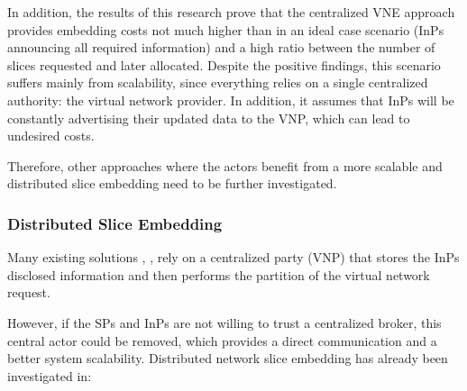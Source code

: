 In addition, the results of this research prove that the centralized VNE approach provides embedding costs not much higher than in an ideal case scenario (InPs announcing all required information) and a high ratio between the number of slices requested and later allocated. Despite the positive findings, this scenario suffers mainly from scalability, since everything relies on a single centralized authority: the virtual network provider. In addition, it assumes that InPs will be constantly advertising their updated data to the VNP, which can lead to undesired costs.

Therefore, other approaches where the actors benefit from a more scalable and distributed slice embedding need to be further investigated.

\subsubsection{Distributed Slice Embedding}

Many existing solutions \citep{houidi2011virtual}, \citep{dietrich2015multi}, \citep{dietrich2017multi} rely on a centralized party (VNP) that stores the InPs disclosed information and then performs the partition of the virtual network request. 

However, if the SPs and InPs are not willing to trust a centralized broker, this central actor could be removed, which provides a direct communication and a better system scalability. Distributed network slice embedding has already been investigated in:

